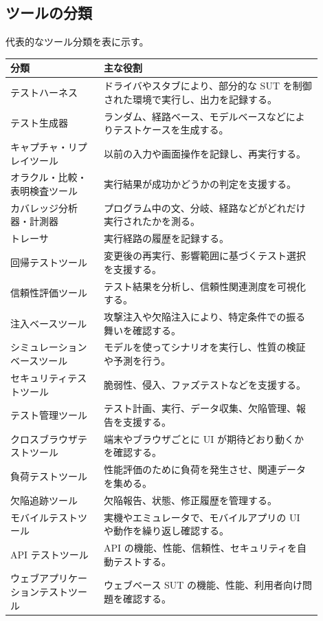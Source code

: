 \documentclass[uplatex,dvipdfmx,a4paper,11pt,nomag]{jsarticle}
\begin{document}
\subsection{ツールの分類}
代表的なツール分類を表に示す。

\begin{longtable}{P{0.27\linewidth}P{0.63\linewidth}}
\toprule
\textbf{分類} & \textbf{主な役割} \\
\midrule
テストハーネス & ドライバやスタブにより、部分的な SUT を制御された環境で実行し、出力を記録する。\\
テスト生成器 & ランダム、経路ベース、モデルベースなどによりテストケースを生成する。\\
キャプチャ・リプレイツール & 以前の入力や画面操作を記録し、再実行する。\\
オラクル・比較・表明検査ツール & 実行結果が成功かどうかの判定を支援する。\\
カバレッジ分析器・計測器 & プログラム中の文、分岐、経路などがどれだけ実行されたかを測る。\\
トレーサ & 実行経路の履歴を記録する。\\
回帰テストツール & 変更後の再実行、影響範囲に基づくテスト選択を支援する。\\
信頼性評価ツール & テスト結果を分析し、信頼性関連測度を可視化する。\\
注入ベースツール & 攻撃注入や欠陥注入により、特定条件での振る舞いを確認する。\\
シミュレーションベースツール & モデルを使ってシナリオを実行し、性質の検証や予測を行う。\\
セキュリティテストツール & 脆弱性、侵入、ファズテストなどを支援する。\\
テスト管理ツール & テスト計画、実行、データ収集、欠陥管理、報告を支援する。\\
クロスブラウザテストツール & 端末やブラウザごとに UI が期待どおり動くかを確認する。\\
負荷テストツール & 性能評価のために負荷を発生させ、関連データを集める。\\
欠陥追跡ツール & 欠陥報告、状態、修正履歴を管理する。\\
モバイルテストツール & 実機やエミュレータで、モバイルアプリの UI や動作を繰り返し確認する。\\
API テストツール & API の機能、性能、信頼性、セキュリティを自動テストする。\\
ウェブアプリケーションテストツール & ウェブベース SUT の機能、性能、利用者向け問題を確認する。\\
\bottomrule
\end{longtable}
\end{document}
